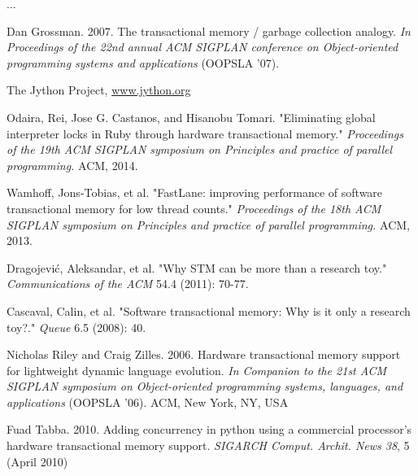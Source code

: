 \documentclass{sigplanconf}
\begin{document}


\acks
...





\begin{thebibliography}{}
\softraggedright

  Dan Grossman. 2007. The transactional memory / garbage collection
  analogy. \emph{In Proceedings of the 22nd annual ACM SIGPLAN
    conference on Object-oriented programming systems and
    applications} (OOPSLA '07).

  The Jython Project, \url{www.jython.org}

  Odaira, Rei, Jose G. Castanos, and Hisanobu Tomari.  "Eliminating
  global interpreter locks in Ruby through hardware transactional
  memory."  \emph{Proceedings of the 19th ACM SIGPLAN symposium on
    Principles and practice of parallel programming.} ACM, 2014.

  Wamhoff, Jons-Tobias, et al. "FastLane: improving performance of
  software transactional memory for low thread counts."
  \emph{Proceedings of the 18th ACM SIGPLAN symposium on Principles
    and practice of parallel programming.} ACM, 2013.

  Dragojević, Aleksandar, et al. "Why STM can be more than a research
  toy." \emph{Communications of the ACM} 54.4 (2011): 70-77.

  Cascaval, Calin, et al. "Software transactional memory: Why is it
  only a research toy?." \emph{Queue} 6.5 (2008): 40.

  Nicholas Riley and Craig Zilles. 2006. Hardware transactional memory
  support for lightweight dynamic language evolution. \emph{In
    Companion to the 21st ACM SIGPLAN symposium on Object-oriented
    programming systems, languages, and applications} (OOPSLA
  '06). ACM, New York, NY, USA

  Fuad Tabba. 2010. Adding concurrency in python using a commercial
  processor's hardware transactional memory support. \emph{SIGARCH
  Comput. Archit. News 38}, 5 (April 2010)


\end{thebibliography}
\end{document}
